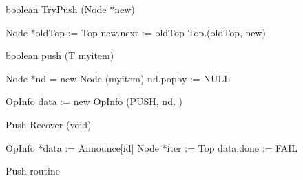\begin{figure*}
	
\begin{procedure}[H]
	\caption{boolean TryPush (Node *new)}
	
	Node *oldTop := Top\;
	new.next := oldTop\;
	\KwRet Top.\CAS(oldTop, new)
\end{procedure}

\begin{procedure}[H]
	\caption{boolean push (T myitem)}
	
	Node *nd = new Node (myitem)\;
	nd.popby := NULL \;
	
	OpInfo data := new OpInfo (PUSH, nd, \False) \;
\end{procedure}

\begin{procedure}[H]
	\caption{Push-Recover (void)}
	
	OpInfo *data := Announce[id] \;
	 {\KwRet \True}
	Node *iter := Top \;
	 {
			data.done := \True \;
			\KwRet \True \;
	}
	\KwRet FAIL \;
\end{procedure}

\caption{Push routine}
\end{figure*}




